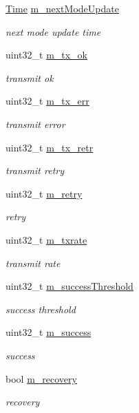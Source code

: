 \begin{DoxyCompactItemize}
\item 
\hyperlink{classns3_1_1Time}{Time} \hyperlink{structns3_1_1AmrrWifiRemoteStation_a88efb67884ce8a8c48aadcd0b8b3b8b0}{m\+\_\+next\+Mode\+Update}
\begin{DoxyCompactList}\small\item\em next mode update time \end{DoxyCompactList}\item 
uint32\+\_\+t \hyperlink{structns3_1_1AmrrWifiRemoteStation_ae02ed58bfa7c06422b6f22df79479f48}{m\+\_\+tx\+\_\+ok}
\begin{DoxyCompactList}\small\item\em transmit ok \end{DoxyCompactList}\item 
uint32\+\_\+t \hyperlink{structns3_1_1AmrrWifiRemoteStation_ad47607d52d697b501554d76d3545396c}{m\+\_\+tx\+\_\+err}
\begin{DoxyCompactList}\small\item\em transmit error \end{DoxyCompactList}\item 
uint32\+\_\+t \hyperlink{structns3_1_1AmrrWifiRemoteStation_aeab8f20bfe93934c9e7e89deeed6a9f8}{m\+\_\+tx\+\_\+retr}
\begin{DoxyCompactList}\small\item\em transmit retry \end{DoxyCompactList}\item 
uint32\+\_\+t \hyperlink{structns3_1_1AmrrWifiRemoteStation_acc0c57ff01e4a74e4fa2aae8a3f2e7cd}{m\+\_\+retry}
\begin{DoxyCompactList}\small\item\em retry \end{DoxyCompactList}\item 
uint32\+\_\+t \hyperlink{structns3_1_1AmrrWifiRemoteStation_ac2278b11fa5618edb3d520373566830b}{m\+\_\+txrate}
\begin{DoxyCompactList}\small\item\em transmit rate \end{DoxyCompactList}\item 
uint32\+\_\+t \hyperlink{structns3_1_1AmrrWifiRemoteStation_af1f4073ea61c0e54c8bdf74d637843cc}{m\+\_\+success\+Threshold}
\begin{DoxyCompactList}\small\item\em success threshold \end{DoxyCompactList}\item 
uint32\+\_\+t \hyperlink{structns3_1_1AmrrWifiRemoteStation_a8b0b6d64af5acdeafa04cea5130c9441}{m\+\_\+success}
\begin{DoxyCompactList}\small\item\em success \end{DoxyCompactList}\item 
bool \hyperlink{structns3_1_1AmrrWifiRemoteStation_aa8b710ef1e1fb1adfa221f7189f70487}{m\+\_\+recovery}
\begin{DoxyCompactList}\small\item\em recovery \end{DoxyCompactList}\end{DoxyCompactItemize}
